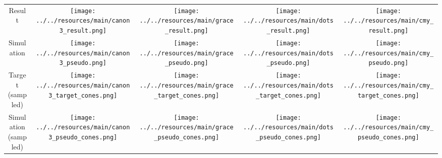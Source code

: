 \begin{table}[H]
\begin{tabular}{ccccc}
 
  \shortstack{ Result \\ \vspace{0.9cm} } &
  \texttt{[image: ../../resources/main/canon3\_result.png]} &
  \texttt{[image: ../../resources/main/grace\_result.png]} &
  \texttt{[image: ../../resources/main/dots\_result.png]} & 
  \texttt{[image: ../../resources/main/cmy\_result.png]}  \\
  
  \shortstack{ Simulation \\ \vspace{0.9cm} } &
  
  \texttt{[image: ../../resources/main/canon3\_pseudo.png]} &
  \texttt{[image: ../../resources/main/grace\_pseudo.png]} &
  \texttt{[image: ../../resources/main/dots\_pseudo.png]} &
  \texttt{[image: ../../resources/main/cmy\_pseudo.png]} \\

  \shortstack{ Target \\ (sampled) \\ \vspace{0.5cm} } &
 
  \texttt{[image: ../../resources/main/canon3\_target\_cones.png]} &
  \texttt{[image: ../../resources/main/grace\_target\_cones.png]} &
  \texttt{[image: ../../resources/main/dots\_target\_cones.png]} &
  \texttt{[image: ../../resources/main/cmy\_target\_cones.png]} \\
  
  \shortstack{ Simulation \\ (sampled) \\ \vspace{0.5cm} } & 
  \texttt{[image: ../../resources/main/canon3\_pseudo\_cones.png]} & 
  \texttt{[image: ../../resources/main/grace\_pseudo\_cones.png]} & 
  \texttt{[image: ../../resources/main/dots\_pseudo\_cones.png]} & 
  \texttt{[image: ../../resources/main/cmy\_pseudo\_cones.png]}  \\
  
 \end{tabular}
\end{table}


